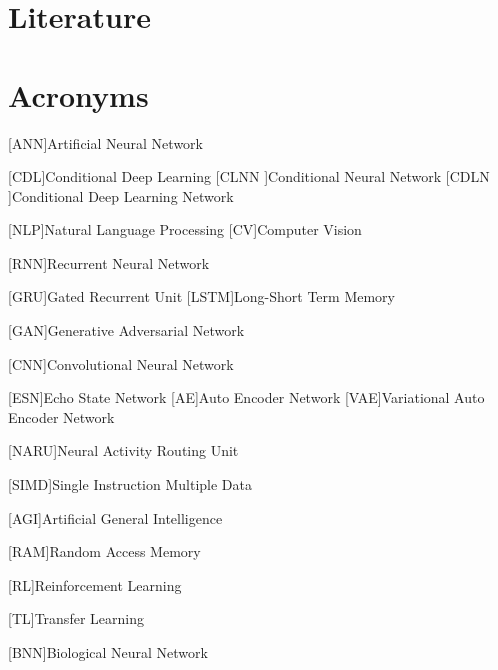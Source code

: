 \chapter*{Literature}
\printbibliography[type=book,heading=subbibliography,title={Books}]
\printbibliography[type=patent, heading=subbibliography, title={Patents}]
\printbibliography[type=article, heading=subbibliography, title={Journal Articles}]
\printbibliography[type=inproceedings, heading=subbibliography, title={Conference Papers}]
\printbibliography[type=incollection, heading=subbibliography, title={Incollections}]
\printbibliography[type=picture, heading=subbibliography, title={Pictures}]
\printbibliography[type=website, heading=subbibliography, title={Websites}]
\printbibliography[type=misc, heading=subbibliography, title={Web Sources}]
\clearpage
  
\listoffigures
\clearpage

\listoftables
\clearpage

\printglossary[type=\acronymtype]

\chapter*{Acronyms}%
\begin{acronym}[XXXXX] 

    [ANN]{Artificial Neural Network}

      [CDL]{Conditional Deep Learning} 
     [CLNN ]{Conditional Neural Network}
     [CDLN ]{Conditional Deep Learning Network} 

    [NLP]{Natural Language Processing}
     [CV]{Computer Vision}

    [RNN]{Recurrent Neural Network} 

    [GRU]{Gated Recurrent Unit} 
    [LSTM]{Long-Short Term Memory} 

    [GAN]{Generative Adversarial Network} 

    [CNN]{Convolutional Neural Network} 

    [ESN]{Echo State Network}
    [AE]{Auto Encoder Network}
    [VAE]{Variational Auto Encoder Network}

    [NARU]{Neural Activity Routing Unit} 

    [SIMD]{Single Instruction Multiple Data}

    [AGI]{Artificial General Intelligence}

    [RAM]{Random Access Memory}

    [RL]{Reinforcement Learning}
 
    [TL]{Transfer Learning}
  
    [BNN]{Biological Neural Network}

\end{acronym}
